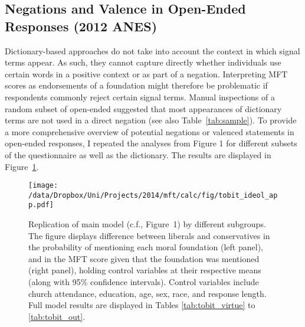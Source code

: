 \clearpage
\subsection{Negations and Valence in Open-Ended Responses (2012 ANES)}\label{app:oevalence}

Dictionary-based approaches do not take into account the context in which signal terms appear. As such, they cannot capture directly whether individuals use certain words in a positive context or as part of a negation. Interpreting MFT scores as endorsements of a foundation might therefore be problematic if respondents commonly reject certain signal terms. Manual inspections of a random subset of open-ended suggested that most appearances of dictionary terms are not used in a direct negation (see also Table~\ref{tab:sample}). To provide a more comprehensive overview of potential negations or valenced statements in open-ended responses, I repeated the analyses from Figure 1 for different subsets of the questionnaire as well as the dictionary. The results are displayed in Figure~\ref{fig:tobit_ideol_app}.

\begin{figure}[ht]\centering
\texttt{[image: /data/Dropbox/Uni/Projects/2014/mft/calc/fig/tobit\_ideol\_app.pdf]}
\caption[Replication of main model predicting MFT scores based on ideology by different subgroups]{Replication of main model (c.f., Figure~1) by different subgroups. The figure displays difference between liberals and conservatives in the probability of mentioning each moral foundation (left panel), and in the MFT score given that the foundation was mentioned (right panel), holding control variables at their respective means (along with 95\% confidence intervals). Control variables include church attendance, education, age, sex, race, and response length. Full model results are displayed in Tables \ref{tab:tobit_virtue} to \ref{tab:tobit_out}.
}\label{fig:tobit_ideol_app}
\end{figure}

